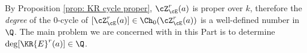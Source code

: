 


%




By Proposition \ref{prop: KR cycle proper}, $\cZ^{r}_{\cE}(a)$ is proper over $k$,
therefore the {\em degree} of the $0$-cycle of $[\cZ^{r}_{\cE}(a)]\in \Ch_{0}(\cZ^r_{\cE}(a))$ is a well-defined  number in $\Q$.  The main problem we are concerned with in this Part is to determine $\deg [\KR{E}^r(a)] \in \Q$.







